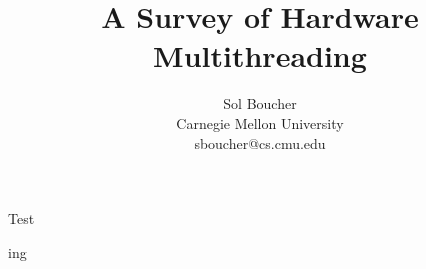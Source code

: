 \documentclass[letterpaper,12pt]{article}
\title{A Survey of Hardware Multithreading}
\author{Sol Boucher \\ Carnegie Mellon University \\ sboucher@cs.cmu.edu}
\date{}
\begin{document}
\maketitle
\thispagestyle{empty}
\begin{multicols}{2}

Test

\columnbreak

ing

\end{multicols}
\end{document}
